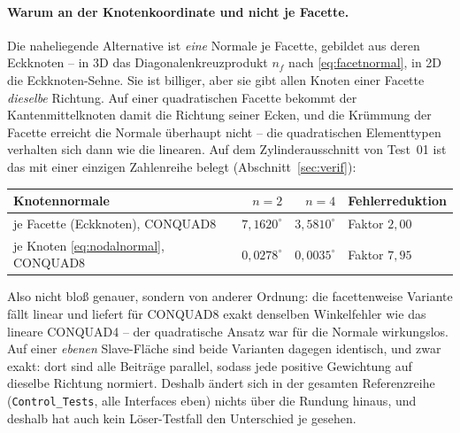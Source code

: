 \documentclass[a4paper,11pt]{article}
\def\bm#1{#1}%
\newcommand{\file}[1]{\texttt{\small #1}}
\begin{document}
\paragraph{Warum an der Knotenkoordinate und nicht je Facette.}
Die naheliegende Alternative ist \emph{eine} Normale je Facette, gebildet aus deren Eckknoten --
in 3D das Diagonalenkreuzprodukt $\bm n_f$ nach \eqref{eq:facetnormal}, in 2D die Eckknoten-Sehne.
Sie ist billiger, aber sie gibt allen Knoten einer Facette \emph{dieselbe} Richtung. Auf einer
quadratischen Facette bekommt der Kantenmittelknoten damit die Richtung seiner Ecken, und die
Krümmung der Facette erreicht die Normale überhaupt nicht -- die quadratischen Elementtypen
verhalten sich dann wie die linearen. Auf dem Zylinderausschnitt von Test~01 ist das mit einer
einzigen Zahlenreihe belegt (Abschnitt~\ref{sec:verif}):

\begin{center}
\small
\begin{tabular}{lrrl}
\toprule
Knotennormale & $n=2$ & $n=4$ & Fehlerreduktion \\
\midrule
je Facette (Eckknoten), CONQUAD8 & $7{,}1620^\circ$ & $3{,}5810^\circ$ & Faktor $2{,}00$ \\
je Knoten \eqref{eq:nodalnormal}, CONQUAD8 & $0{,}0278^\circ$ & $0{,}0035^\circ$ & Faktor $7{,}95$ \\
\bottomrule
\end{tabular}
\end{center}

\noindent Also nicht bloß genauer, sondern von anderer Ordnung: die facettenweise Variante fällt
linear und liefert für CONQUAD8 exakt denselben Winkelfehler wie das lineare CONQUAD4 --
der quadratische Ansatz war für die Normale wirkungslos. Auf einer \emph{ebenen} Slave-Fläche sind
beide Varianten dagegen identisch, und zwar exakt: dort sind alle Beiträge parallel, sodass jede
positive Gewichtung auf dieselbe Richtung normiert. Deshalb ändert sich in der gesamten
Referenzreihe (\file{Control\_Tests}, alle Interfaces eben) nichts über die Rundung hinaus, und
deshalb hat auch kein Löser-Testfall den Unterschied je gesehen.
\end{document}

